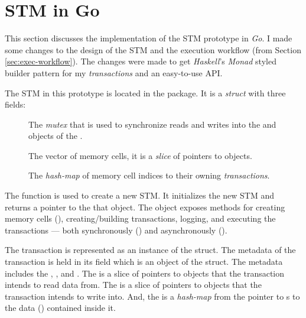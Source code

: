 \documentclass[../main]{subfiles}
\begin{document}
  \section{STM in Go}

  \par
  This section discusses the implementation of the STM prototype in {\em Go}. I made some changes to the design of the STM and the execution workflow (from Section \ref{sec:exec-workflow}). The changes were made to get {\em Haskell}'s {\em Monad} styled builder pattern for my {\em transactions} and an easy-to-use API. \par

  The STM in this prototype is located in the  package. It is a {\em struct} with three fields:
  
  \begin{description}
    
    \item[] The {\em mutex} that is used to synchronize reads and writes into the  and  objects of the .

    \item[] The vector of memory cells, it is a {\em slice} of pointers to  objects.

    \item[] The {\em hash-map} of memory cell indices to their owning {\em transactions}.

  \end{description}

  \par
  The  function is used to create a new STM. It initializes the new STM and returns a pointer to the that object. The  object exposes methods for creating memory cells (), creating/building transactions, logging, and executing the transactions --- both synchronously () and asynchronously (). \par

  The transaction is represented as an instance of the  struct. The metadata of the transaction is held in its  field which is an object of the  struct. The metadata includes the , , and . The  is a slice of pointers to  objects that the transaction intends to read data from. The  is a slice of pointers to  objects that the transaction intends to write into. And, the  is a {\em hash-map} from the pointer to s to the data () contained inside it. \par
\end{document}
